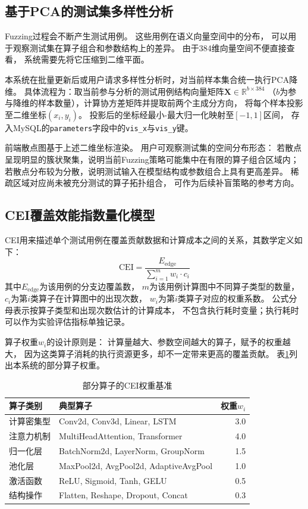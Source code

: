 \subsection{基于PCA的测试集多样性分析}

Fuzzing过程会不断产生测试用例。
这些用例在语义向量空间中的分布，
可以用于观察测试集在算子组合和参数结构上的差异。
由于384维向量空间不便直接查看，
系统需要先将它压缩到二维平面。

本系统在批量更新后或用户请求多样性分析时，对当前样本集合统一执行PCA降维。
具体流程为：取当前参与分析的测试用例结构向量矩阵$\mathbf{X} \in \mathbb{R}^{b \times 384}$
（$b$为参与降维的样本数量），计算协方差矩阵并提取前两个主成分方向，
将每个样本投影至二维坐标$(x_i, y_i)$。
投影后的坐标经最小-最大归一化映射至$[-1, 1]$区间，
存入MySQL的\texttt{parameters}字段中的\texttt{vis\_x}与\texttt{vis\_y}键。

前端散点图基于上述二维坐标渲染。
用户可观察测试集的空间分布形态：
若散点呈现明显的簇状聚集，说明当前Fuzzing策略可能集中在有限的算子组合区域内；
若散点分布较为分散，说明测试输入在模型结构或参数组合上具有更高差异。
稀疏区域对应尚未被充分测试的算子拓扑组合，
可作为后续补盲策略的参考方向。

\subsection{CEI覆盖效能指数量化模型}

CEI用来描述单个测试用例在覆盖贡献数据和计算成本之间的关系，其数学定义如下：
\begin{equation}
\label{eq:cei}
\mathrm{CEI} = \frac{E_{\text{edge}}}{\displaystyle\sum_{i=1}^{m} w_i \cdot c_i}
\end{equation}
其中$E_{\text{edge}}$为该用例的分支边覆盖数，
$m$为该用例计算图中不同算子类型的数量，
$c_i$为第$i$类算子在计算图中的出现次数，
$w_i$为第$i$类算子对应的权重系数。
公式分母表示按算子类型和出现次数估计的计算成本，
不包含执行耗时变量；执行耗时可以作为实验评估指标单独记录。

算子权重$w_i$的设计原则是：
计算量越大、参数空间越大的算子，赋予的权重越大，
因为这类算子消耗的执行资源更多，却不一定带来更高的覆盖贡献。
表\ref{tab:operator_weight}列出本系统的部分算子权重。

\begin{table}[htbp]
\centering
\caption{部分算子的CEI权重基准}
\label{tab:operator_weight}
\begin{tabular}{llr}
\toprule
算子类别 & 典型算子 & 权重$w_i$ \\
\midrule
计算密集型 & Conv2d, Conv3d, Linear, LSTM & 3.0 \\
注意力机制 & MultiHeadAttention, Transformer & 4.0 \\
归一化层 & BatchNorm2d, LayerNorm, GroupNorm & 1.5 \\
池化层 & MaxPool2d, AvgPool2d, AdaptiveAvgPool & 1.0 \\
激活函数 & ReLU, Sigmoid, Tanh, GELU & 0.5 \\
结构操作 & Flatten, Reshape, Dropout, Concat & 0.3 \\
\bottomrule
\end{tabular}
\end{table}

